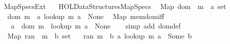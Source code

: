 %
\begin{isabellebody}%
%
%
\isadelimtheory
%
\endisadelimtheory
%
\isatagtheory
{}\isamarkupfalse%
\ Map{\isacharunderscore}{\kern0pt}Specs{\isacharunderscore}{\kern0pt}Ext\isanewline
\ \ \ {\isachardoublequoteopen}HOL{\isacharminus}{\kern0pt}Data{\isacharunderscore}{\kern0pt}Structures{\isachardot}{\kern0pt}Map{\isacharunderscore}{\kern0pt}Specs{\isachardoublequoteclose}\isanewline
{}%
\endisatagtheory
{\isafoldtheory}%
%
\isadelimtheory
%
\endisadelimtheory
%
\isadelimdocument
%
\endisadelimdocument
%
\isatagdocument
%
\isamarkuptrue%
%
\endisatagdocument
{\isafolddocument}%
%
\isadelimdocument
%
\endisadelimdocument
{}\isamarkupfalse%
\ {\isacharparenleft}{\kern0pt}\ Map{\isacharparenright}{\kern0pt}\ dom\ {\isacharcolon}{\kern0pt}{\isacharcolon}{\kern0pt}\ {\isachardoublequoteopen}{\isacharprime}{\kern0pt}m\ {\isasymRightarrow}\ {\isacharprime}{\kern0pt}a\ set{\isachardoublequoteclose}\ \isanewline
\ \ {\isachardoublequoteopen}dom\ m\ {\isasymequiv}\ {\isacharbraceleft}{\kern0pt}a{\isachardot}{\kern0pt}\ lookup\ m\ a\ {\isasymnoteq}\ None{\isacharbraceright}{\kern0pt}{\isachardoublequoteclose}\isanewline
\isanewline
{}\isamarkupfalse%
\ {\isacharparenleft}{\kern0pt}\ Map{\isacharparenright}{\kern0pt}\ mem{\isacharunderscore}{\kern0pt}dom{\isacharunderscore}{\kern0pt}iff{\isacharcolon}{\kern0pt}\isanewline
\ \ \ {\isachardoublequoteopen}a\ {\isasymin}\ dom\ m\ {\isasymlongleftrightarrow}\ lookup\ m\ a\ {\isasymnoteq}\ None{\isachardoublequoteclose}\isanewline
%
\isadelimproof
\ \ %
\endisadelimproof
%
\isatagproof
{}\isamarkupfalse%
\ {\isacharparenleft}{\kern0pt}simp\ add{\isacharcolon}{\kern0pt}\ dom{\isacharunderscore}{\kern0pt}def{\isacharparenright}{\kern0pt}%
\endisatagproof
{\isafoldproof}%
%
\isadelimproof
\isanewline
%
\endisadelimproof
\isanewline
{}\isamarkupfalse%
\ {\isacharparenleft}{\kern0pt}\ Map{\isacharparenright}{\kern0pt}\ ran\ {\isacharcolon}{\kern0pt}{\isacharcolon}{\kern0pt}\ {\isachardoublequoteopen}{\isacharprime}{\kern0pt}m\ {\isasymRightarrow}\ {\isacharprime}{\kern0pt}b\ set{\isachardoublequoteclose}\ \isanewline
\ \ {\isachardoublequoteopen}ran\ m\ {\isasymequiv}\ {\isacharbraceleft}{\kern0pt}b{\isachardot}{\kern0pt}\ {\isasymexists}a{\isachardot}{\kern0pt}\ lookup\ m\ a\ {\isacharequal}{\kern0pt}\ Some\ b{\isacharbraceright}{\kern0pt}{\isachardoublequoteclose}\isanewline

\end{isabellebody}
